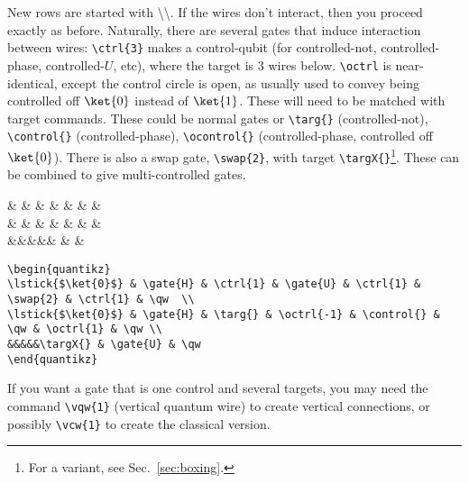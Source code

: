 \documentclass[aps,pra,10pt,nofootinbib]{revtex4}
\begin{document}
New rows are started with \textbackslash\textbackslash. If the wires don't interact, then you proceed exactly as before. Naturally, there are several gates that induce interaction between wires: \verb!\ctrl{3}! makes a control-qubit (for controlled-not, controlled-phase, controlled-$U$, etc), where the target is 3 wires below. \verb!\octrl! is near-identical, except the control circle is open, as usually used to convey being controlled off $\ket{0}$ instead of $\ket{1}$. These will need to be matched with target commands. These could be normal gates or \verb!\targ{}! (controlled-not), \verb!\control{}! (controlled-phase), \verb!\ocontrol{}! (controlled-phase, controlled off $\ket{0}$). There is also a swap gate, \verb!\swap{2}!, with target \verb!\targX{}!\footnote{For a variant, see Sec.\ \ref{sec:boxing}.}. These can be combined to give multi-controlled gates.
\begin{Code}
\begin{center}
\begin{quantikz}
 &  &  &  &  &  &  & \qw  \\
 &  & \targ{} &  & \control{} & \qw &  & \qw \\
&&&&&\targX{} &  & \qw
\end{quantikz}
\end{center}
\tcblower
\begin{lstlisting}
\begin{quantikz}
\lstick{$\ket{0}$} & \gate{H} & \ctrl{1} & \gate{U} & \ctrl{1} & \swap{2} & \ctrl{1} & \qw  \\
\lstick{$\ket{0}$} & \gate{H} & \targ{} & \octrl{-1} & \control{} & \qw & \octrl{1} & \qw \\
&&&&&\targX{} & \gate{U} & \qw
\end{quantikz}
\end{lstlisting}
\end{Code}

If you want a gate that is one control and several targets, you may need the command \verb!\vqw{1}! (vertical quantum wire) to create vertical connections, or possibly \verb!\vcw{1}! to create the classical version.
\end{document}
